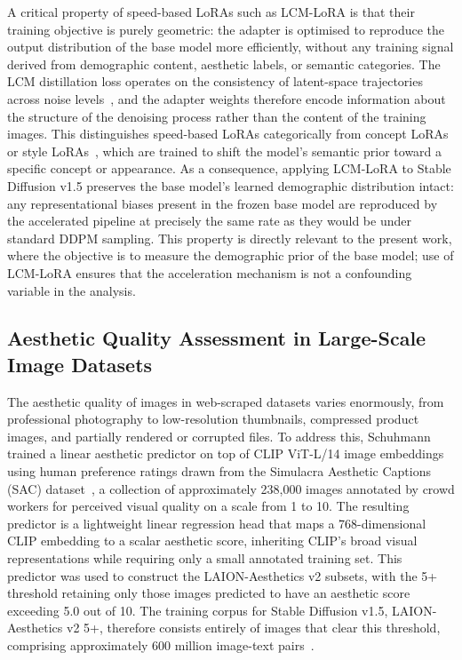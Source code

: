 A critical property of speed-based LoRAs such as LCM-LoRA is that their
training objective is purely geometric: the adapter is optimised to
reproduce the output distribution of the base model more efficiently,
without any training signal derived from demographic content, aesthetic
labels, or semantic categories. The LCM distillation loss operates on the
consistency of latent-space trajectories across noise
levels~\cite{Song_2023_LCM}, and the adapter weights therefore encode
information about the structure of the denoising process rather than the
content of the training images. This distinguishes speed-based LoRAs
categorically from concept LoRAs~\cite{Hu_2021_LoRA} or style
LoRAs~\cite{Ruiz_2023_DreamBooth}, which are trained to shift the
model's semantic prior toward a specific concept or appearance. As a
consequence, applying LCM-LoRA to Stable Diffusion v1.5 preserves the
base model's learned demographic distribution intact: any representational
biases present in the frozen base model are reproduced by the accelerated
pipeline at precisely the same rate as they would be under standard DDPM
sampling. This property is directly relevant to the present work, where
the objective is to measure the demographic prior of the base model; use of
LCM-LoRA ensures that the acceleration mechanism is not a confounding
variable in the analysis.

\subsection{Aesthetic Quality Assessment in Large-Scale Image Datasets}
\label{subsec:aesthetic_scoring}

The aesthetic quality of images in web-scraped datasets varies enormously,
from professional photography to low-resolution thumbnails, compressed
product images, and partially rendered or corrupted files. To address
this, Schuhmann~\cite{Schuhmann_2022_LaionAesthetics} trained a linear
aesthetic predictor on top of CLIP ViT-L/14 image embeddings using human
preference ratings drawn from the Simulacra Aesthetic Captions (SAC)
dataset~\cite{Pressman_2022_SAC}, a collection of approximately 238,000 images
annotated by crowd workers for perceived visual quality on a scale from 1
to 10. The resulting predictor is a lightweight linear regression head that
maps a 768-dimensional CLIP embedding to a scalar aesthetic score,
inheriting CLIP's broad visual representations while requiring only a small
annotated training set. This predictor was used to construct the
LAION-Aesthetics v2 subsets, with the 5+ threshold retaining only those
images predicted to have an aesthetic score exceeding 5.0 out of 10. The
training corpus for Stable Diffusion v1.5, LAION-Aesthetics v2 5+,
therefore consists entirely of images that clear this threshold, comprising
approximately 600 million image-text pairs~\cite{StableDiffusion_2022_SD15modelcard}.

